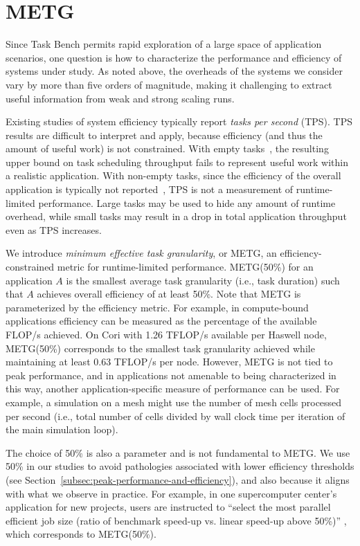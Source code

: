\section{METG}
\label{sec:metg}




Since Task Bench permits rapid exploration of a large space
of application scenarios, one question is how to characterize the
performance and efficiency of systems under study. As noted
above, the overheads of the systems we consider vary by more than
five orders of magnitude, making it challenging to extract useful
information from weak and strong scaling runs.

Existing studies of system efficiency
typically report \emph{tasks per second} (TPS). TPS results
are difficult to interpret and apply, because efficiency (and thus
the amount of useful work) is not constrained. With empty
tasks~\cite{LegionTracing18}, the resulting upper bound on task
scheduling throughput fails to represent useful work within a
realistic application. With non-empty tasks, since the efficiency of
the overall application is typically not reported~\cite{Canary16,
  Armstrong14}, TPS is not a measurement of runtime-limited
performance. Large tasks may be used to hide any amount of runtime
overhead, while small tasks may result in a drop in total application
throughput even as TPS increases.

We introduce \emph{minimum effective task granularity}, or METG, an
efficiency-constrained metric for runtime-limited
performance. METG(50\%) for an application $A$ is
the smallest average task granularity (i.e., task duration) such that $A$
achieves overall efficiency of at least 50\%. Note that METG is parameterized by the efficiency metric. For example, in
compute-bound applications efficiency can be measured as the
percentage of the available FLOP/s achieved. On Cori with 1.26 TFLOP/s available per Haswell node, METG(50\%) corresponds to
the smallest task granularity achieved while maintaining at least 0.63
TFLOP/s per node. However, METG is not tied to peak performance, and
in applications not amenable to being characterized in this way,
another application-specific measure of performance can be used. For
example, a simulation on a mesh might use the number of mesh cells
processed per second (i.e., total number of cells divided by wall
clock time per iteration of the main simulation loop).

The choice of 50\% is also a parameter and is not fundamental to
METG. We use 50\% in our studies to avoid pathologies
associated with lower efficiency thresholds (see
Section~\ref{subsec:peak-performance-and-efficiency}), and also
because it aligns with what we observe in practice. For example, in one supercomputer center's application for new projects, users are instructed to ``select the
most parallel efficient job size (ratio of benchmark speed-up
vs. linear speed-up above 50\%)'' \cite{CSCSReport}, which corresponds
to METG(50\%).


